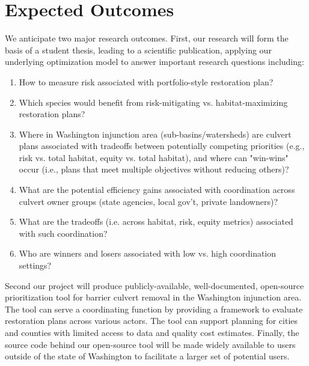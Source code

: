 \documentclass[12pt]{elsarticle}
\begin{document}


\section{Expected Outcomes} %

We anticipate two major research outcomes. First, our research will form the basis of a student thesis, leading to a scientific publication, applying our underlying optimization model to answer important research questions including:

\begin{enumerate}
\item How to measure risk associated with portfolio-style restoration plan? 
\item Which species would benefit from risk-mitigating vs. habitat-maximizing restoration plans?
\item Where in Washington injunction area (sub-basins/watersheds) are culvert plans associated with tradeoffs between potentially competing priorities (e.g., risk vs. total habitat, equity vs. total habitat), and where can "win-wins" occur (i.e., plans that meet multiple objectives without reducing others)?
\item What are the potential efficiency gains associated with coordination across culvert owner groups (state agencies, local gov't, private landowners)? 
\item What are the tradeoffs (i.e. across habitat, risk, equity metrics) associated with such coordination? 
\item Who are winners and losers associated with low vs. high coordination settings?
\end{enumerate}


Second our project will produce publicly-available, well-documented, open-source prioritization tool for barrier culvert removal in the Washington injunction area. The tool can serve a coordinating function by providing a framework to evaluate restoration plans across various actors. The tool can support planning for cities and counties with limited access to data and quality cost estimates. Finally, the source code behind our open-source tool will be made widely available to users outside of the state of Washington to facilitate a larger set of potential users. 
\end{document}
